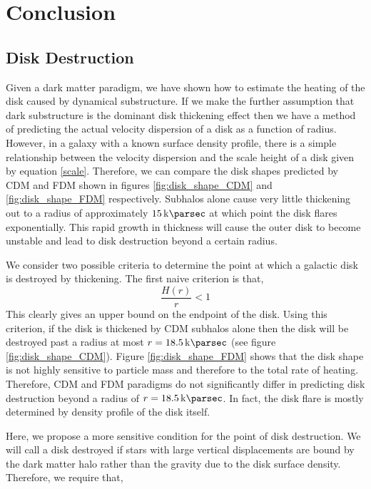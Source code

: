 \documentclass[usenatbib]{mnras}
\begin{document}
\section{Conclusion}

\subsection{Disk Destruction}

Given a dark matter paradigm, we have shown how to estimate the heating of the disk caused by dynamical substructure. If we make the further assumption that dark substructure is the dominant disk thickening effect then we have a method of predicting the actual velocity dispersion of a disk as a function of radius. However, in a galaxy with a known surface density   profile, there is a simple relationship between the velocity dispersion and the scale height of a disk given by equation \ref{scale}. Therefore, we can compare the disk shapes predicted by CDM and FDM shown in figures \ref{fig:disk_shape_CDM} and \ref{fig:disk_shape_FDM} respectively. Subhalos alone cause very little thickening out to a radius of approximately $\SI{15}{\kilo \parsec}$ at which point the disk flares exponentially. This rapid growth in thickness will cause the outer disk to become unstable and lead to disk destruction beyond a certain radius. 
\par 
We consider two possible criteria to determine the point at which a galactic disk is destroyed by thickening. The first naive criterion is that, 
\begin{equation}
\frac{H(r)}{r} < 1
\end{equation}
This clearly gives an upper bound on the endpoint of the disk. Using this criterion, if the disk is thickened by CDM subhalos alone then the disk will be destroyed past a radius at most $r = \SI{18.5}{\kilo \parsec}$ (see figure \ref{fig:disk_shape_CDM}). Figure \ref{fig:disk_shape_FDM} shows that the disk shape is not highly sensitive to particle mass and therefore to the total rate of heating. Therefore, CDM and FDM paradigms do not significantly differ in predicting disk destruction beyond a radius of $r = \SI{18.5}{\kilo \parsec}$. In fact, the disk flare is mostly determined by density profile of the disk itself.  
\par
	Here, we propose a more sensitive condition for the point of disk destruction. We will call a disk destroyed if stars with large vertical displacements are bound by the dark matter halo rather than the gravity due to the disk surface density. Therefore, we require that,
\end{document}
